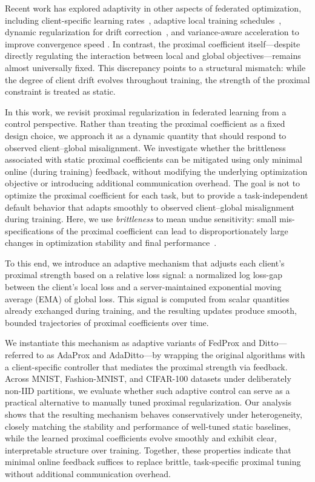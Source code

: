 \documentclass[letterpaper]{article} %
\begin{document}
Recent work has explored adaptivity in other aspects of federated optimization, including client-specific learning rates~\cite{kim2024adaptive}, adaptive local training schedules~\cite{shenaj2025adaptive}, dynamic regularization for drift correction~\cite{acar2021feddyn}, and variance-aware acceleration to improve convergence speed \cite{wu2023faster}. In contrast, the proximal coefficient itself—despite directly regulating the interaction between local and global objectives—remains almost universally fixed. This discrepancy points to a structural mismatch: while the degree of client drift evolves throughout training, the strength of the proximal constraint is treated as static.

In this work, we revisit proximal regularization in federated learning from a control perspective. Rather than treating the proximal coefficient as a fixed design choice, we approach it as a dynamic quantity that should respond to observed client--global misalignment. We investigate whether the brittleness associated with static proximal coefficients can be mitigated using only minimal online (during training) feedback, without modifying the underlying optimization objective or introducing additional communication overhead. The goal is not to optimize the proximal coefficient for each task, but to provide a task-independent default behavior that adapts smoothly to observed client–global misalignment during training. Here, we use \emph{brittleness} to mean undue sensitivity: small mis-specifications of the proximal coefficient can lead to disproportionately large changes in optimization stability and final performance~\cite{yu2024effect, li2020federated, li2021ditto}.

To this end, we introduce an adaptive mechanism that adjusts each client's proximal strength based on a relative loss signal: a normalized log loss-gap between the client's local loss and a server-maintained exponential moving average (EMA) of global loss. This signal is computed from scalar quantities already exchanged during training, and the resulting updates produce smooth, bounded trajectories of proximal coefficients over time.

We instantiate this mechanism as adaptive variants of FedProx and Ditto—referred to as AdaProx and AdaDitto—by wrapping the original algorithms with a client-specific controller that mediates the proximal strength via feedback. Across MNIST, Fashion-MNIST, and CIFAR-100 datasets under deliberately non-IID partitions, we evaluate whether such adaptive control can serve as a practical alternative to manually tuned proximal regularization. Our analysis shows that the resulting mechanism behaves conservatively under heterogeneity, closely matching the stability and performance of well-tuned static baselines, while the learned proximal coefficients evolve smoothly and exhibit clear, interpretable structure over training. Together, these properties indicate that minimal online feedback suffices to replace brittle, task-specific proximal tuning without additional communication overhead.
\end{document}
